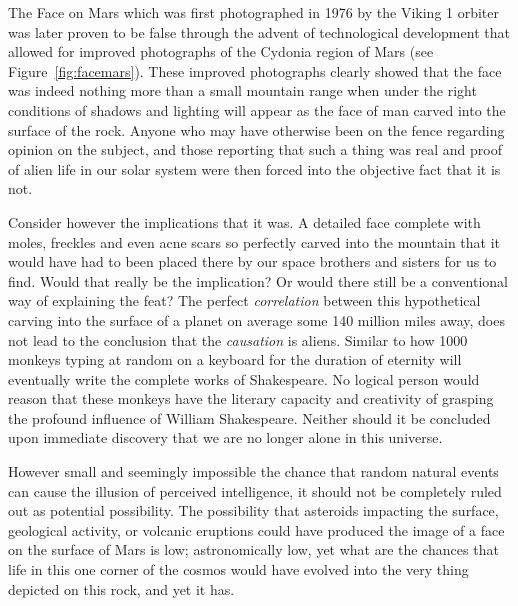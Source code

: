 The Face on Mars which was first photographed in 1976 by the Viking 1 orbiter was
later proven to be false through the advent of technological development that
allowed for improved photographs of the Cydonia region of Mars (see Figure~\ref{fig:facemars}). These improved
photographs clearly showed that the face was indeed nothing more than a small
mountain range when under the right conditions of shadows and lighting will appear
as the face of man carved into the surface of the rock. Anyone who may have
otherwise been on the fence regarding opinion on the subject, and those reporting
that such a thing was real and proof of alien life in our solar system were then
forced into the objective fact that it is not.

Consider however the implications that it was. A detailed face complete with moles,
freckles and even acne scars so perfectly carved into the mountain that it would
have had to been placed there by our space brothers and sisters for us to find.
Would that really be the implication? Or would there still be a conventional way of
explaining the feat? The perfect \emph{correlation} between this hypothetical
carving into the surface of a planet on average some 140 million miles away,
does not lead to the conclusion that the \emph{causation} is aliens. Similar to how
1000 monkeys typing at random on a keyboard for the duration of eternity will
eventually write the complete works of Shakespeare. No logical person would reason
that these monkeys have the literary capacity and creativity of grasping the
profound influence of William Shakespeare. Neither should it be concluded upon
immediate discovery that we are no longer alone in this universe.

However small and seemingly impossible the chance that random natural events can
cause the illusion of perceived intelligence, it should not be completely ruled out
as potential possibility. The possibility that asteroids impacting the surface,
geological activity, or volcanic eruptions could have produced the image of a face
on the surface of Mars is low; astronomically low, yet what are the chances that
life in this one corner of the cosmos would have evolved into the very thing
depicted on this rock, and yet it has.

